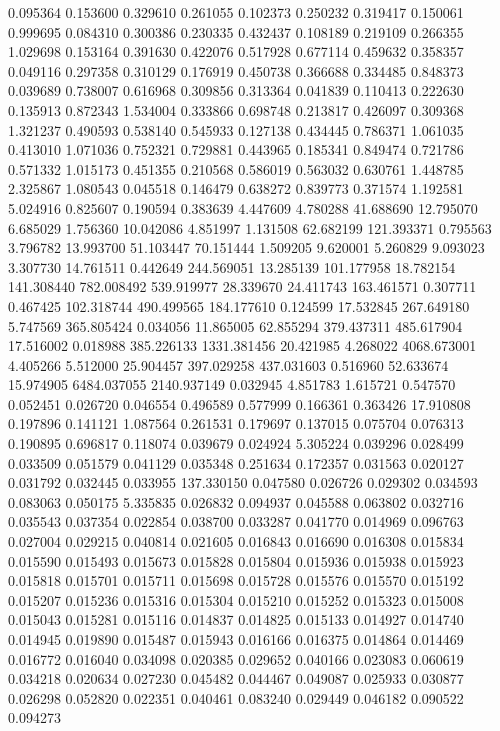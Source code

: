 0.095364
0.153600
0.329610
0.261055
0.102373
0.250232
0.319417
0.150061
0.999695
0.084310
0.300386
0.230335
0.432437
0.108189
0.219109
0.266355
1.029698
0.153164
0.391630
0.422076
0.517928
0.677114
0.459632
0.358357
0.049116
0.297358
0.310129
0.176919
0.450738
0.366688
0.334485
0.848373
0.039689
0.738007
0.616968
0.309856
0.313364
0.041839
0.110413
0.222630
0.135913
0.872343
1.534004
0.333866
0.698748
0.213817
0.426097
0.309368
1.321237
0.490593
0.538140
0.545933
0.127138
0.434445
0.786371
1.061035
0.413010
1.071036
0.752321
0.729881
0.443965
0.185341
0.849474
0.721786
0.571332
1.015173
0.451355
0.210568
0.586019
0.563032
0.630761
1.448785
2.325867
1.080543
0.045518
0.146479
0.638272
0.839773
0.371574
1.192581
5.024916
0.825607
0.190594
0.383639
4.447609
4.780288
41.688690
12.795070
6.685029
1.756360
10.042086
4.851997
1.131508
62.682199
121.393371
0.795563
3.796782
13.993700
51.103447
70.151444
1.509205
9.620001
5.260829
9.093023
3.307730
14.761511
0.442649
244.569051
13.285139
101.177958
18.782154
141.308440
782.008492
539.919977
28.339670
24.411743
163.461571
0.307711
0.467425
102.318744
490.499565
184.177610
0.124599
17.532845
267.649180
5.747569
365.805424
0.034056
11.865005
62.855294
379.437311
485.617904
17.516002
0.018988
385.226133
1331.381456
20.421985
4.268022
4068.673001
4.405266
5.512000
25.904457
397.029258
437.031603
0.516960
52.633674
15.974905
6484.037055
2140.937149
0.032945
4.851783
1.615721
0.547570
0.052451
0.026720
0.046554
0.496589
0.577999
0.166361
0.363426
17.910808
0.197896
0.141121
1.087564
0.261531
0.179697
0.137015
0.075704
0.076313
0.190895
0.696817
0.118074
0.039679
0.024924
5.305224
0.039296
0.028499
0.033509
0.051579
0.041129
0.035348
0.251634
0.172357
0.031563
0.020127
0.031792
0.032445
0.033955
137.330150
0.047580
0.026726
0.029302
0.034593
0.083063
0.050175
5.335835
0.026832
0.094937
0.045588
0.063802
0.032716
0.035543
0.037354
0.022854
0.038700
0.033287
0.041770
0.014969
0.096763
0.027004
0.029215
0.040814
0.021605
0.016843
0.016690
0.016308
0.015834
0.015590
0.015493
0.015673
0.015828
0.015804
0.015936
0.015938
0.015923
0.015818
0.015701
0.015711
0.015698
0.015728
0.015576
0.015570
0.015192
0.015207
0.015236
0.015316
0.015304
0.015210
0.015252
0.015323
0.015008
0.015043
0.015281
0.015116
0.014837
0.014825
0.015133
0.014927
0.014740
0.014945
0.019890
0.015487
0.015943
0.016166
0.016375
0.014864
0.014469
0.016772
0.016040
0.034098
0.020385
0.029652
0.040166
0.023083
0.060619
0.034218
0.020634
0.027230
0.045482
0.044467
0.049087
0.025933
0.030877
0.026298
0.052820
0.022351
0.040461
0.083240
0.029449
0.046182
0.090522
0.094273
